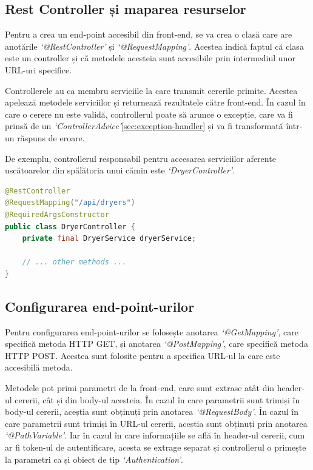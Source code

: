 \documentclass[12pt,a4paper]{report}
\theoremstyle{definition}
\theoremstyle{remark}
\begin{document}
\subsection{Rest Controller și maparea resurselor}

\par Pentru a crea un end-point accesibil din front-end, se va crea o clasă care are anotările \textit{`@RestController'} și \textit{`@RequestMapping'}\cite{burke2009restful}. Acestea indică faptul că clasa este un controller și că metodele acesteia sunt accesibile prin intermediul unor URL-uri specifice.

\par Controllerele au ca membru serviciile la care transmit cererile primite. Acestea apelează metodele serviciilor și returnează rezultatele către front-end. În cazul în care o cerere nu este validă, controllerul poate să arunce o excepție, care va fi prinsă de un \textit{`ControllerAdvice'}\ref{sec:exception-handler} și va fi transformată într-un răspuns de eroare.

\par De exemplu, controllerul responsabil pentru accesarea serviciilor aferente uscătoarelor din spălătoria unui cămin este \textit{`DryerController'}.

\begin{lstlisting}[language=Java, caption={Clasa DryerController}]
@RestController
@RequestMapping("/api/dryers")
@RequiredArgsConstructor
public class DryerController {
    private final DryerService dryerService;

    // ... other methods ...
}
\end{lstlisting}

\subsection{Configurarea end-point-urilor}

\par Pentru configurarea end-point-urilor se folosește anotarea \textit{`@GetMapping'}, care specifică metoda HTTP GET, și anotarea \textit{`@PostMapping'}, care specifică metoda HTTP POST\cite{varanasi2015spring}. Acestea sunt folosite pentru a specifica URL-ul la care este accesibilă metoda.

\par Metodele pot primi parametri de la front-end, care sunt extrase atât din header-ul cererii, cât și din body-ul acesteia. În cazul în care parametrii sunt trimiși în body-ul cererii, aceștia sunt obținuți prin anotarea \textit{`@RequestBody'}. În cazul în care parametrii sunt trimiși în URL-ul cererii, aceștia sunt obținuți prin anotarea \textit{`@PathVariable'}. Iar în cazul în care informațiile se află în header-ul cererii, cum ar fi token-ul de autentificare, acesta se extrage separat și controllerul o primește la parametri ca și obiect de tip \textit{`Authentication'}.
\end{document}
